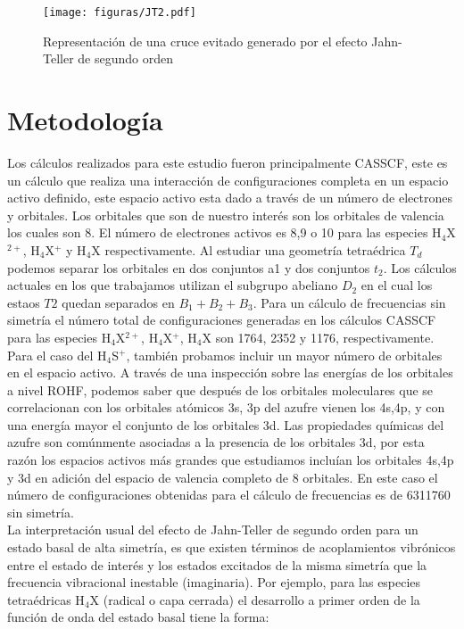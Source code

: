 \documentclass[12pt]{report}
\begin{document}
\begin{figure}[h]
\centering
\texttt{[image: figuras/JT2.pdf]} 
\caption{Representación de una cruce evitado generado por el efecto Jahn-Teller de segundo orden }
\end{figure}

\newpage


\chapter{Metodología}

Los cálculos realizados para este estudio fueron principalmente CASSCF, este es un cálculo que realiza una interacción de configuraciones completa en un espacio activo definido, este espacio activo esta dado a través de un número de electrones y orbitales. Los orbitales que son de nuestro interés son los orbitales de valencia los cuales son 8. El número de electrones activos es 8,9 o 10 para las especies H$_4$X$^{2+}$, H$_4$X$^+$ y H$_4$X respectivamente. Al estudiar una geometría tetraédrica $T_d$ podemos separar los orbitales en dos conjuntos a1 y dos conjuntos $t_2$. Los cálculos actuales en los que trabajamos utilizan el subgrupo abeliano $D_2$ en el cual los estaos $T2$ quedan separados en $B_1+B_2+B_3$. Para un cálculo de frecuencias sin simetría el número total de configuraciones generadas en los cálculos CASSCF para las especies H$_4$X$^{2+}$, H$_4$X$^+$, H$_4$X son 1764, 2352 y 1176, respectivamente. 
\\


Para el caso del H$_4$S$^+$, también probamos incluir un mayor número de orbitales en el espacio activo. A través de una inspección sobre las energías de los orbitales a nivel ROHF, podemos saber que después de los orbitales moleculares que se correlacionan con los orbitales atómicos 3s, 3p del azufre vienen los 4s,4p, y con una energía mayor el conjunto de los orbitales 3d. Las propiedades químicas del azufre son comúnmente asociadas a la presencia de los orbitales 3d, por esta razón los espacios activos más grandes que estudiamos incluían los orbitales 4s,4p y 3d en adición del espacio de valencia completo de 8 orbitales. En este caso el número de configuraciones obtenidas para el cálculo de frecuencias es de 6311760 sin simetría.
\\


La interpretación usual del efecto de Jahn-Teller de segundo orden para un estado basal de alta simetría, es que existen términos de acoplamientos vibrónicos entre el estado de interés y los estados excitados de la misma simetría que la frecuencia vibracional inestable (imaginaria). Por ejemplo, para las especies tetraédricas H$_4$X (radical o capa cerrada) el desarrollo a primer orden de la función de onda del estado basal tiene la forma: 
\end{document}
